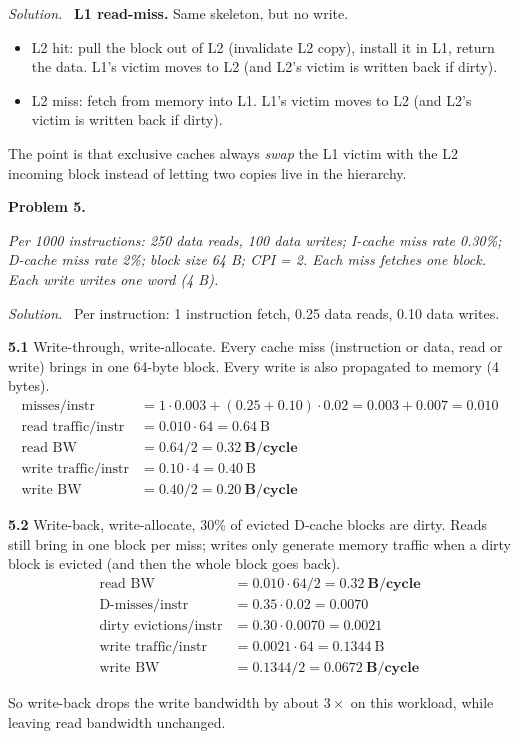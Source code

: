 \documentclass[12pt]{article}
\newcommand{\problem}[1]{\vspace{0.8em}\noindent\textbf{Problem #1.}\vspace{0.35em}}
\newenvironment{solution}{\par\noindent\textit{Solution.}\ }{\par\vspace{1.1em}}
\newcommand{\subproblem}[1]{\par\vspace{0.45em}\noindent\textbf{#1}\quad}
\newcommand{\assigntext}[1]{\par\vspace{0.25em}\small\textit{#1}\par\vspace{0.35em}}
\begin{document}
\begin{solution}
\textbf{L1 read-miss.} Same skeleton, but no write.
\begin{itemize}\itemsep0pt
    \item L2 hit: pull the block out of L2 (invalidate L2 copy), install it in L1, return the data. L1's victim moves to L2 (and L2's victim is written back if dirty).
    \item L2 miss: fetch from memory into L1. L1's victim moves to L2 (and L2's victim is written back if dirty).
\end{itemize}
The point is that exclusive caches always \emph{swap} the L1 victim with the L2 incoming block instead of letting two copies live in the hierarchy.
\end{solution}

\problem{5}
\assigntext{Per 1000 instructions: 250 data reads, 100 data writes; I-cache miss rate 0.30\%; D-cache miss rate 2\%; block size 64 B; CPI = 2. Each miss fetches one block. Each write writes one word (4 B).}

\begin{solution}
Per instruction: 1 instruction fetch, 0.25 data reads, 0.10 data writes.

\subproblem{5.1} Write-through, write-allocate. Every cache miss (instruction or data, read or write) brings in one 64-byte block. Every write is also propagated to memory (4 bytes).
\begin{align*}
\text{misses/instr} &= 1\cdot 0.003 + (0.25 + 0.10)\cdot 0.02 = 0.003 + 0.007 = 0.010 \\
\text{read traffic/instr} &= 0.010 \cdot 64 = 0.64\ \text{B} \\
\text{read BW} &= 0.64 / 2 = \mathbf{0.32\ \text{B/cycle}} \\
\text{write traffic/instr} &= 0.10 \cdot 4 = 0.40\ \text{B} \\
\text{write BW} &= 0.40 / 2 = \mathbf{0.20\ \text{B/cycle}}
\end{align*}

\subproblem{5.2} Write-back, write-allocate, 30\% of evicted D-cache blocks are dirty. Reads still bring in one block per miss; writes only generate memory traffic when a dirty block is evicted (and then the whole block goes back).
\begin{align*}
\text{read BW} &= 0.010 \cdot 64 / 2 = \mathbf{0.32\ \text{B/cycle}} \\
\text{D-misses/instr} &= 0.35 \cdot 0.02 = 0.0070 \\
\text{dirty evictions/instr} &= 0.30 \cdot 0.0070 = 0.0021 \\
\text{write traffic/instr} &= 0.0021 \cdot 64 = 0.1344\ \text{B} \\
\text{write BW} &= 0.1344 / 2 = \mathbf{0.0672\ \text{B/cycle}}
\end{align*}

So write-back drops the write bandwidth by about $3{\times}$ on this workload, while leaving read bandwidth unchanged.
\end{solution}
\end{document}
